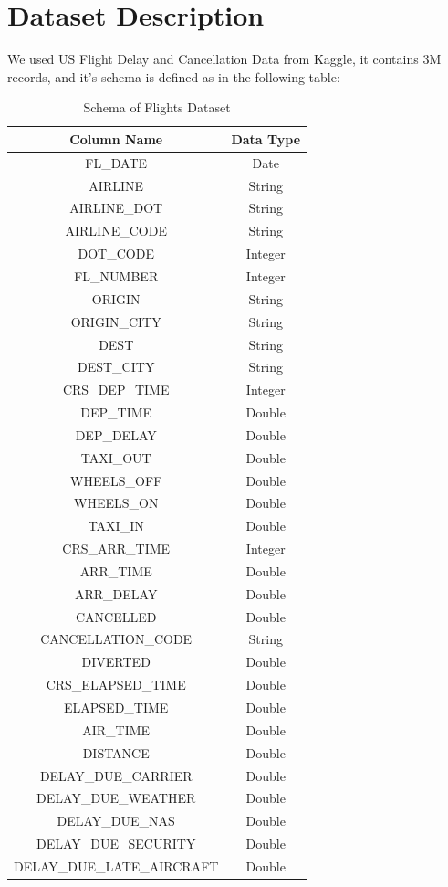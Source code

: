 \documentclass{article}
\begin{document}
\section{Dataset Description}
We used US Flight Delay and Cancellation Data from Kaggle, it contains 3M records, and it's schema is defined as in the following table:
\begin{table}[H]
\centering
\begin{tabular}{|c|c|}
\hline
\textbf{Column Name} & \textbf{Data Type} \\
\hline
FL\_DATE & Date \\
AIRLINE & String \\
AIRLINE\_DOT & String \\
AIRLINE\_CODE & String \\
DOT\_CODE & Integer \\
FL\_NUMBER & Integer \\
ORIGIN & String \\
ORIGIN\_CITY & String \\
DEST & String \\
DEST\_CITY & String \\
CRS\_DEP\_TIME & Integer \\
DEP\_TIME & Double \\
DEP\_DELAY & Double \\
TAXI\_OUT & Double \\
WHEELS\_OFF & Double \\
WHEELS\_ON & Double \\
TAXI\_IN & Double \\
CRS\_ARR\_TIME & Integer \\
ARR\_TIME & Double \\
ARR\_DELAY & Double \\
CANCELLED & Double \\
CANCELLATION\_CODE & String \\
DIVERTED & Double \\
CRS\_ELAPSED\_TIME & Double \\
ELAPSED\_TIME & Double \\
AIR\_TIME & Double \\
DISTANCE & Double \\
DELAY\_DUE\_CARRIER & Double \\
DELAY\_DUE\_WEATHER & Double \\
DELAY\_DUE\_NAS & Double \\
DELAY\_DUE\_SECURITY & Double \\
DELAY\_DUE\_LATE\_AIRCRAFT & Double \\



\hline
\end{tabular}
\caption{Schema of Flights Dataset}
\end{table}
\end{document}
